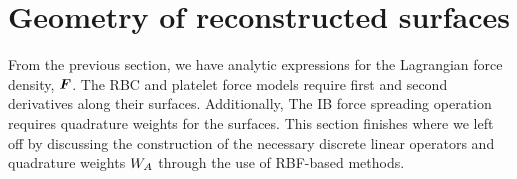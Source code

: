 



\section{Geometry of reconstructed surfaces}\label{sec:surfaces}

From the previous section, we have analytic expressions for the Lagrangian force density,
$\boldsymbol{F}$. The RBC and platelet force models require first and second derivatives along their
surfaces. Additionally, The IB force spreading operation requires quadrature weights for
the surfaces. This section finishes where we left off by discussing the construction of
the necessary discrete linear operators and quadrature weights $\weight[A]$ through the
use of RBF-based methods.




